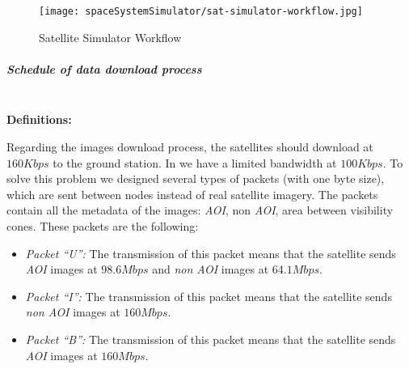 \begin{figure}[!h]
\begin{center}
\texttt{[image: spaceSystemSimulator/sat-simulator-workflow.jpg]}
\caption{Satellite Simulator Workflow}
\label{fig:sss-sat-simulator-workflow}
\end{center}
\end{figure}

\subparagraph{Schedule of data download process}
\label{subpar:shedule-process}~\\

\textbf{Definitions:}

Regarding the images download process, the satellites should download at
$160Kbps$ to the ground station. In \vw we have a limited bandwidth at
$100Kbps$. To solve this problem we designed several types of packets (with one
byte size), which are sent between \vw nodes instead of real satellite
imagery. The packets contain all the metadata of the images: \emph{AOI}, non \emph{AOI}, area
between visibility cones.  These packets are the following:
\begin{itemize}
\item \emph{Packet ``U'':} The transmission of this packet means that the satellite sends \emph{AOI} images at $98.6 Mbps$ and \emph{non AOI} images at $64.1Mbps$. 
\item \emph{Packet ``I'':} The transmission of this packet means that the satellite sends \emph{non AOI} images at $160 Mbps$. 
\item \emph{Packet ``B'':} The transmission of this packet means that the
  satellite sends \emph{AOI} images at $160 Mbps$. 
\end{itemize}

